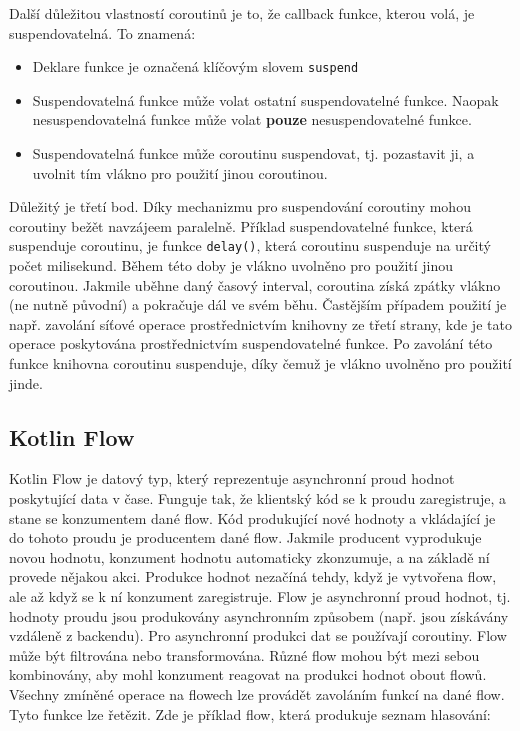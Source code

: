 Další důležitou vlastností coroutinů je to, že callback funkce, kterou volá, je suspendovatelná. To znamená:

\begin{itemize}
	\item Deklare funkce je označená klíčovým slovem \lstinline|suspend|
	\item Suspendovatelná funkce může volat ostatní suspendovatelné funkce. Naopak nesuspendovatelná funkce může volat \textbf{pouze} nesuspendovatelné funkce.
	\item Suspendovatelná funkce může coroutinu suspendovat, tj. pozastavit ji, a uvolnit tím vlákno pro použití jinou coroutinou.
\end{itemize}

\noindent Důležitý je třetí bod. Díky mechanizmu pro suspendování coroutiny mohou coroutiny bežět navzájeem paralelně. Příklad suspendovatelné funkce, která suspenduje coroutinu, je funkce \linebreak \lstinline|delay()|, která coroutinu suspenduje na určitý počet milisekund. Během této doby je vlákno uvolněno pro použití jinou coroutinou. Jakmile uběhne daný časový interval, coroutina získá zpátky vlákno (ne nutně původní) a pokračuje dál ve svém běhu. Častějším případem použití je např. zavolání síťové operace prostřednictvím knihovny ze třetí strany, kde je tato operace poskytována prostřednictvím suspendovatelné funkce. Po zavolání této funkce knihovna coroutinu suspenduje, díky čemuž je vlákno uvolněno pro použití jinde.

\subsection*{Kotlin Flow}
Kotlin Flow \cite{kotlinflow} je datový typ, který reprezentuje asynchronní proud hodnot poskytující data v čase. Funguje tak, že klientský kód se k proudu zaregistruje, a stane se konzumentem dané flow. Kód produkující nové hodnoty a vkládající je do tohoto proudu je producentem dané flow. Jakmile producent vyprodukuje novou hodnotu, konzument hodnotu automaticky \linebreak zkonzumuje, a na základě ní provede nějakou akci. Produkce hodnot nezačíná tehdy, když je vytvořena flow, ale až když se k ní konzument zaregistruje. Flow je asynchronní proud \linebreak hodnot, tj. hodnoty proudu jsou produkovány asynchronním způsobem (např. jsou získávány vzdáleně \linebreak z backendu). Pro asynchronní produkci dat se používají coroutiny. Flow může být filtrována nebo transformována. Různé flow mohou být mezi sebou kombinovány, aby mohl konzument reagovat na produkci hodnot obout flowů. Všechny zmíněné operace na flowech lze provádět zavoláním funkcí na dané flow. Tyto funkce lze řetězit. Zde je příklad flow, která produkuje seznam hlasování:


